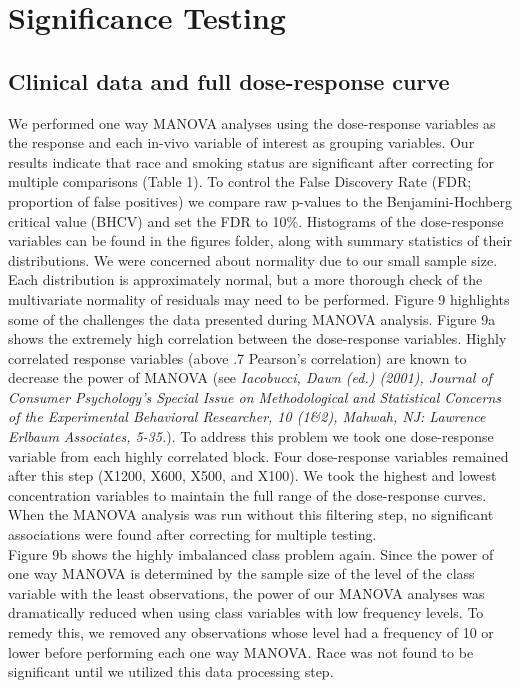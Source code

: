 \documentclass[12pt]{article}
\begin{document}
\section{Significance Testing}
\subsection{Clinical data and full dose-response curve}

We performed one way MANOVA analyses using the dose-response variables as the response and each in-vivo variable of interest as grouping variables.  Our results indicate that race and smoking status are  significant after correcting for multiple comparisons (Table 1).  To control the False Discovery Rate (FDR; proportion of false positives) we compare raw p-values to the Benjamini-Hochberg critical value (BHCV) and set the FDR to 10\%. Histograms of the dose-response variables can be found in the figures folder, along with summary statistics of their distributions.  We were concerned about normality due to our small sample size.  Each distribution is approximately normal, but a more thorough check of the multivariate normality of residuals may need to be performed.  Figure 9 highlights some of the challenges the data presented during MANOVA analysis. Figure 9a shows the extremely high correlation between the dose-response variables.  Highly correlated response variables (above .7 Pearson's correlation) are known to decrease the power of MANOVA (see \textit{Iacobucci, Dawn (ed.) (2001), Journal of Consumer Psychology's Special Issue on Methodological and Statistical Concerns of the Experimental Behavioral Researcher, 10 (1\&2), Mahwah, NJ: Lawrence Erlbaum Associates, 5-35.}).  To address this problem we took one dose-response variable from each highly correlated block. Four dose-response variables remained after this step (X1200, X600, X500, and X100).  We took the highest and lowest concentration variables to maintain the full range of the dose-response curves.  When the MANOVA analysis was run without this filtering step, no significant associations were found after correcting for multiple testing.  \\

Figure 9b shows the highly imbalanced class problem again.  Since the power of one way MANOVA is determined by the sample size of the level of the class variable with the least observations, the power of our MANOVA analyses was dramatically reduced when using class variables with low frequency levels. To remedy this, we removed any observations whose level had a frequency of 10 or lower before performing each one way MANOVA.  Race was not found to be significant until we utilized this data processing step. 
\end{document}
